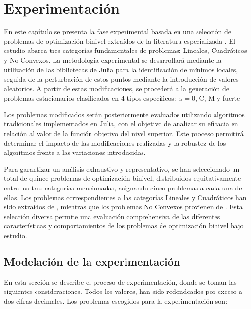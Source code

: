
\chapter{Experimentación}


En este capítulo se presenta la fase experimental basada en una selección de problemas de optimización binivel extraídos de la literatura especializada \cite{BolibTestProblems}. El estudio abarca tres categorías fundamentales de problemas: Lineales, Cuadráticos y No Convexos. La metodología experimental se desarrollará mediante la utilización de las bibliotecas de Julia para la identificación de mínimos locales, seguida de la perturbación de estos puntos mediante la introducción de valores aleatorios. A partir de estas modificaciones, se procederá a la generación de problemas estacionarios clasificados en 4 tipos específicos: $\alpha = 0$, C, M y fuerte

Los problemas modificados serán posteriormente evaluados utilizando algoritmos tradicionales implementados en Julia, con el objetivo de analizar su eficacia en relación al valor de la función objetivo del nivel superior. Este proceso permitirá determinar el impacto de las modificaciones realizadas y la robustez de los algoritmos frente a las variaciones introducidas.

Para garantizar un análisis exhaustivo y representativo, se han seleccionado un total de quince problemas de optimización binivel, distribuidos equitativamente entre las tres categorías mencionadas, asignando cinco problemas a cada una de ellas. Los problemas correspondientes a las categorías Lineales y Cuadráticos han sido extraídos de \cite{Floudas1999HandbookOT}, mientras que los problemas No Convexos provienen de \cite{BolibTestProblems}. Esta selección diversa permite una evaluación comprehensiva de las diferentes características y comportamientos de los problemas de optimización binivel bajo estudio.



\section{Modelación de la experimentación}
En esta sección se describe el proceso de experimentación, donde se toman las siguientes consideraciones. 
Todos los valores, han sido redondeados por exceso a dos cifras decimales. 
Los problemas escogidos para la experimentación son:

